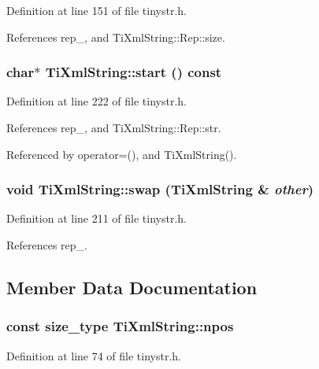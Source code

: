 Definition at line 151 of file tinystr.h.

References rep\_\-, and TiXmlString::Rep::size.\hypertarget{class_ti_xml_string_a36417caceebe25352f53a87e8cd966b4}{
\subsubsection[{start}]{\setlength{\rightskip}{0pt plus 5cm}char$\ast$ TiXmlString::start () const}}
\label{class_ti_xml_string_a36417caceebe25352f53a87e8cd966b4}


Definition at line 222 of file tinystr.h.

References rep\_\-, and TiXmlString::Rep::str.

Referenced by operator=(), and TiXmlString().\hypertarget{class_ti_xml_string_aa392cbc180752a79f007f4f9280c7762}{
\subsubsection[{swap}]{\setlength{\rightskip}{0pt plus 5cm}void TiXmlString::swap ({\bf TiXmlString} \& {\em other})}}
\label{class_ti_xml_string_aa392cbc180752a79f007f4f9280c7762}


Definition at line 211 of file tinystr.h.

References rep\_\-.

\subsection{Member Data Documentation}
\hypertarget{class_ti_xml_string_a1aa6260982d3a63f0c822fe40fd7b37f}{
\subsubsection[{npos}]{\setlength{\rightskip}{0pt plus 5cm}const {\bf size\_\-type} {\bf TiXmlString::npos}}}
\label{class_ti_xml_string_a1aa6260982d3a63f0c822fe40fd7b37f}


Definition at line 74 of file tinystr.h.

